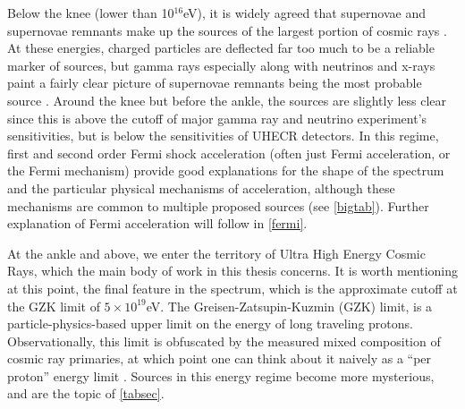 Below the knee (lower than 10$^{16}$eV), it is widely agreed that supernovae and supernovae remnants make up the sources of the largest portion of cosmic rays \cite{stanev, crapp}. At these energies, charged particles are deflected far too much to be a reliable marker of sources, but gamma rays especially along with neutrinos and x-rays paint a fairly clear picture of supernovae remnants being the most probable source \cite{stanev, sean, foteini}. Around the knee but before the ankle, the sources are slightly less clear since this is above the cutoff of major gamma ray and neutrino experiment's sensitivities, but is below the sensitivities of UHECR detectors. In this regime, first and second order Fermi shock acceleration (often just Fermi acceleration, or the Fermi mechanism) provide good explanations for the shape of the spectrum and the particular physical mechanisms of acceleration, although these mechanisms are common to multiple proposed sources (see \autoref{bigtab}). Further explanation of Fermi acceleration will follow in \autoref{fermi}. %

At the ankle and above, we enter the territory of Ultra High Energy Cosmic Rays, which the main body of work in this thesis 
concerns. It is worth mentioning at this point, the final feature in the spectrum, which is the approximate cutoff at the GZK limit of $5\times10^{19}$eV. The Greisen-Zatsupin-Kuzmin (GZK) limit, is a particle-physics-based upper limit on the energy of long traveling protons. Observationally, this limit is obfuscated by the measured mixed composition of cosmic ray primaries, at which point one can think about it naively as a ``per proton'' energy limit \cite{futuregzk}. Sources in this energy regime become more mysterious, and are the topic of \autoref{tabsec}. 


